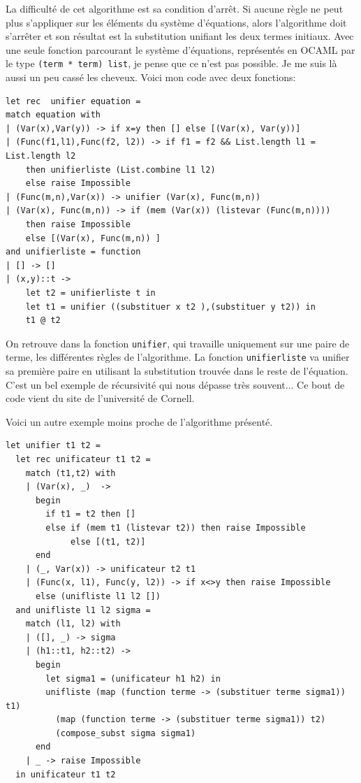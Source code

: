 \documentclass[11pt]{book}
\begin{document}
La difficulté de cet algorithme est  sa condition d'arrêt. 
 Si aucune règle ne peut plus s'appliquer sur les éléments du système d'équations, alors l'algorithme doit s'arrêter et son résultat est
la substitution unifiant les deux termes initiaux.
Avec une seule fonction parcourant le système d'équations, représentés en OCAML par le type \verb+(term * term) list+,
je pense que ce n'est pas possible. Je me suis là aussi un peu cassé les cheveux.
Voici mon code avec deux fonctions:
\begin{Verbatim}
let rec  unifier equation =
match equation with
| (Var(x),Var(y)) -> if x=y then [] else [(Var(x), Var(y))] 
| (Func(f1,l1),Func(f2, l2)) -> if f1 = f2 && List.length l1 = List.length l2 
	then unifierliste (List.combine l1 l2)
	else raise Impossible
| (Func(m,n),Var(x)) -> unifier (Var(x), Func(m,n)) 
| (Var(x), Func(m,n)) -> if (mem (Var(x)) (listevar (Func(m,n)))) 
	then raise Impossible
	else [(Var(x), Func(m,n)) ] 
and unifierliste = function
| [] -> []
| (x,y)::t ->
	let t2 = unifierliste t in
	let t1 = unifier ((substituer x t2 ),(substituer y t2)) in
	t1 @ t2
\end{Verbatim}
On retrouve dans la fonction \verb+unifier+, qui travaille uniquement sur une paire de terme, les différentes règles
de l'algorithme. La fonction \verb+unifierliste+ va unifier sa première paire en utilisant la substitution trouvée dans le reste
de l'équation. C'est un bel exemple de récursivité qui nous dépasse très souvent... 
Ce bout de code vient du site de l'université de Cornell.

Voici un autre exemple moins proche de l'algorithme présenté.
\begin{Verbatim}
let unifier t1 t2 =
  let rec unificateur t1 t2 =
    match (t1,t2) with
    | (Var(x), _)  -> 
      begin
        if t1 = t2 then [] 
        else if (mem t1 (listevar t2)) then raise Impossible
             else [(t1, t2)]
      end		  
    | (_, Var(x)) -> unificateur t2 t1
    | (Func(x, l1), Func(y, l2)) -> if x<>y then raise Impossible
      else (unifliste l1 l2 [])
  and unifliste l1 l2 sigma =
    match (l1, l2) with
    | ([], _) -> sigma
    | (h1::t1, h2::t2) ->
      begin
        let sigma1 = (unificateur h1 h2) in
        unifliste (map (function terme -> (substituer terme sigma1)) t1)
          (map (function terme -> (substituer terme sigma1)) t2)
          (compose_subst sigma sigma1)
      end		
    | _ -> raise Impossible
  in unificateur t1 t2 
\end{Verbatim}
\end{document}

